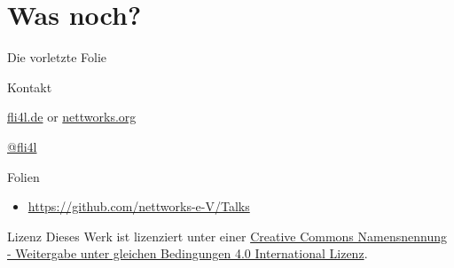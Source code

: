 \documentclass[t]{beamer}
\begin{document}
\section*{Was noch?}

\begin{frame}{Die vorletzte Folie}
    \begin{block}{Kontakt}
        \begin{description}[Twitter]
            \item [WWW] \href{https://www.fli4l.de/}{fli4l.de} or
                    \href{https://www.nettworks.org/}{nettworks.org}
            \item [Twitter] \href{https://twitter.com/fli4l}{@fli4l}
        \end{description}
    \end{block}
    \begin{block}{Folien}
        \begin{itemize}
            \item \url{https://github.com/nettworks-e-V/Talks}
        \end{itemize}
    \end{block}
    \begin{block}{Lizenz}
        Dieses Werk ist lizenziert unter einer
        \href{http://creativecommons.org/licenses/by-sa/4.0/}{Creative Commons
        Namensnennung - Weitergabe unter gleichen Bedingungen 4.0 International
        Lizenz}.
    \end{block}
\end{frame}

\end{document}
